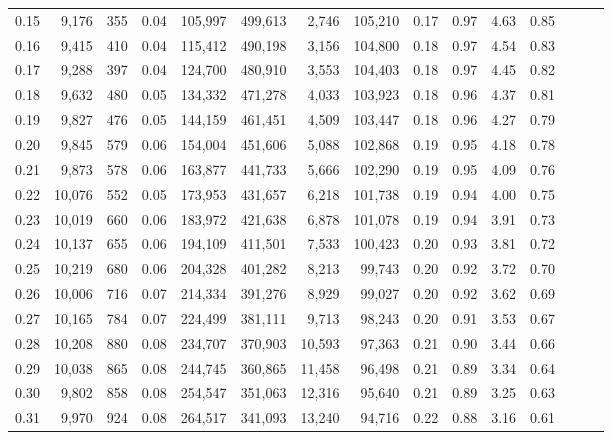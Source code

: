 \begin{tabular}{rrrrrrrrrrrrrrr}
0.15 &   9,176 &    355 &  0.04 &  105,997 &  499,613 &    2,746 &  105,210 &  0.17 &  0.97 &  4.63 &      0.85 \\
0.16 &   9,415 &    410 &  0.04 &  115,412 &  490,198 &    3,156 &  104,800 &  0.18 &  0.97 &  4.54 &      0.83 \\
0.17 &   9,288 &    397 &  0.04 &  124,700 &  480,910 &    3,553 &  104,403 &  0.18 &  0.97 &  4.45 &      0.82 \\
0.18 &   9,632 &    480 &  0.05 &  134,332 &  471,278 &    4,033 &  103,923 &  0.18 &  0.96 &  4.37 &      0.81 \\
0.19 &   9,827 &    476 &  0.05 &  144,159 &  461,451 &    4,509 &  103,447 &  0.18 &  0.96 &  4.27 &      0.79 \\
0.20 &   9,845 &    579 &  0.06 &  154,004 &  451,606 &    5,088 &  102,868 &  0.19 &  0.95 &  4.18 &      0.78 \\
0.21 &   9,873 &    578 &  0.06 &  163,877 &  441,733 &    5,666 &  102,290 &  0.19 &  0.95 &  4.09 &      0.76 \\
0.22 &  10,076 &    552 &  0.05 &  173,953 &  431,657 &    6,218 &  101,738 &  0.19 &  0.94 &  4.00 &      0.75 \\
0.23 &  10,019 &    660 &  0.06 &  183,972 &  421,638 &    6,878 &  101,078 &  0.19 &  0.94 &  3.91 &      0.73 \\
0.24 &  10,137 &    655 &  0.06 &  194,109 &  411,501 &    7,533 &  100,423 &  0.20 &  0.93 &  3.81 &      0.72 \\
0.25 &  10,219 &    680 &  0.06 &  204,328 &  401,282 &    8,213 &   99,743 &  0.20 &  0.92 &  3.72 &      0.70 \\
0.26 &  10,006 &    716 &  0.07 &  214,334 &  391,276 &    8,929 &   99,027 &  0.20 &  0.92 &  3.62 &      0.69 \\
0.27 &  10,165 &    784 &  0.07 &  224,499 &  381,111 &    9,713 &   98,243 &  0.20 &  0.91 &  3.53 &      0.67 \\
0.28 &  10,208 &    880 &  0.08 &  234,707 &  370,903 &   10,593 &   97,363 &  0.21 &  0.90 &  3.44 &      0.66 \\
0.29 &  10,038 &    865 &  0.08 &  244,745 &  360,865 &   11,458 &   96,498 &  0.21 &  0.89 &  3.34 &      0.64 \\
0.30 &   9,802 &    858 &  0.08 &  254,547 &  351,063 &   12,316 &   95,640 &  0.21 &  0.89 &  3.25 &      0.63 \\
0.31 &   9,970 &    924 &  0.08 &  264,517 &  341,093 &   13,240 &   94,716 &  0.22 &  0.88 &  3.16 &      0.61 \\

\end{tabular}
